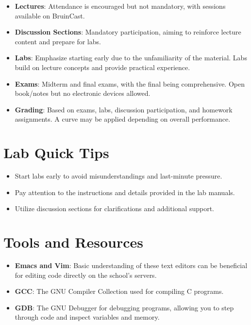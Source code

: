 \documentclass{article}
\begin{document}
\begin{itemize}
    \item \textbf{Lectures}: Attendance is encouraged but not mandatory, with sessions available on BruinCast.
    \item \textbf{Discussion Sections}: Mandatory participation, aiming to reinforce lecture content and prepare for labs.
    \item \textbf{Labs}: Emphasize starting early due to the unfamiliarity of the material. Labs build on lecture concepts and provide practical experience.
    \item \textbf{Exams}: Midterm and final exams, with the final being comprehensive. Open book/notes but no electronic devices allowed.
    \item \textbf{Grading}: Based on exams, labs, discussion participation, and homework assignments. A curve may be applied depending on overall performance.
\end{itemize}

\section{Lab Quick Tips}

\begin{itemize}
    \item Start labs early to avoid misunderstandings and last-minute pressure.
    \item Pay attention to the instructions and details provided in the lab manuals.
    \item Utilize discussion sections for clarifications and additional support.
\end{itemize}

\section{Tools and Resources}

\begin{itemize}
    \item \textbf{Emacs and Vim}: Basic understanding of these text editors can be beneficial for editing code directly on the school's servers.
    \item \textbf{GCC}: The GNU Compiler Collection used for compiling C programs.
    \item \textbf{GDB}: The GNU Debugger for debugging programs, allowing you to step through code and inspect variables and memory.
\end{itemize}
\end{document}
